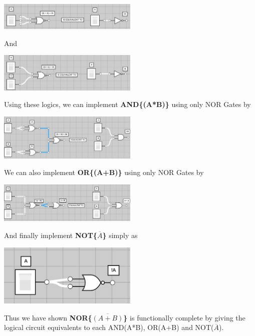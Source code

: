 \documentclass{article}
\begin{document}
    \includegraphics*[width=0.5\textwidth]{NOTA.png}

    And

    \vspace*{0.1in}

    \includegraphics*[width=0.5\textwidth]{A+0.png}

    Using these logics, we can implement \textbf{AND\{(A*B)\}} using only NOR Gates by

    \vspace*{0.1in}

    \includegraphics*[width=0.5\textwidth]{AND.png}

    We can also implement \textbf{OR\{(A+B)\}} using only NOR Gates by

    \vspace*{0.1in}

    \includegraphics*[width=0.5\textwidth]{or.png}

    And finally implement \textbf{NOT\{$\overline{A}$\}} simply as

    \vspace*{0.1in}

    \includegraphics*[width=0.5\textwidth]{not.png}

    Thus we have shown \textbf{NOR\{$\overline{(A+B)}$\}} is functionally complete by giving the logical circuit equivalents to each AND(A*B), OR(A+B) and NOT($\overline{A}$).
\end{document}
